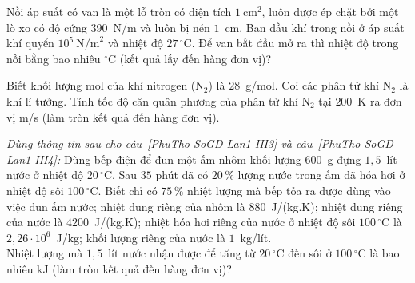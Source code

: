	\begin{ex}%
		Nồi áp suất có van là một lỗ tròn có diện tích $1~\text{cm}^2$, luôn được ép chặt bởi một lò xo có độ cứng $390$~N/m và luôn bị nén $1$~cm. Ban đầu khí trong nồi ở áp suất khí quyển $10^5~\text{N/m}^2$ và nhiệt độ $27\,^\circ\text{C}$. Để van bắt đầu mở ra thì nhiệt độ trong nồi bằng bao nhiêu $^\circ\text{C}$ (kết quả lấy đến hàng đơn vị)?
		\par
	\end{ex}

	\begin{ex}%
		Biết khối lượng mol của khí nitrogen ($\text{N}_2$) là $28$~g/mol. Coi các phân tử khí $\text{N}_2$ là khí lí tưởng. Tính tốc độ căn quân phương của phân tử khí $\text{N}_2$ tại $200$~K ra đơn vị m/s (làm tròn kết quả đến hàng đơn vị).
		\par
	\end{ex}

	\begin{ex}%
		\label{PhuTho-SoGD-Lan1-III3}
		\textit{Dùng thông tin sau cho câu~\ref{PhuTho-SoGD-Lan1-III3} và câu~\ref{PhuTho-SoGD-Lan1-III4}:} Dùng bếp điện để đun một ấm nhôm khối lượng $600$~g đựng $1{,}5$~lít nước ở nhiệt độ $20\,^\circ\text{C}$. Sau $35$ phút đã có $20\,\%$ lượng nước trong ấm đã hóa hơi ở nhiệt độ sôi $100\,^\circ\text{C}$. Biết chỉ có $75\,\%$ nhiệt lượng mà bếp tỏa ra được dùng vào việc đun ấm nước; nhiệt dung riêng của nhôm là $880$~J/(kg.K); nhiệt dung riêng của nước là $4200$~J/(kg.K); nhiệt hóa hơi riêng của nước ở nhiệt độ sôi $100\,^\circ\text{C}$ là $2{,}26\cdot 10^6$~J/kg; khối lượng riêng của nước là $1$~kg/lít.\\
		Nhiệt lượng mà $1{,}5$~lít nước nhận được để tăng từ $20\,^\circ\text{C}$ đến sôi ở $100\,^\circ\text{C}$ là bao nhiêu kJ (làm tròn kết quả đến hàng đơn vị)?
		\par
	\end{ex}

